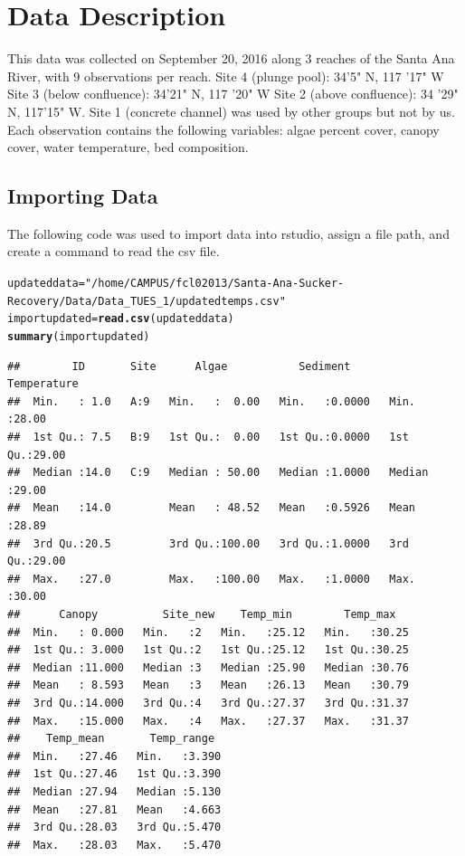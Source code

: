 \documentclass{article}\usepackage[]{graphicx}\usepackage[]{color}
\makeatletter
\newcommand{\hlstr}[1]{\textcolor[rgb]{0.192,0.494,0.8}{#1}}%
\newcommand{\hlstd}[1]{\textcolor[rgb]{0.345,0.345,0.345}{#1}}%
\newcommand{\hlkwb}[1]{\textcolor[rgb]{0.69,0.353,0.396}{#1}}%
\newcommand{\hlkwd}[1]{\textcolor[rgb]{0.737,0.353,0.396}{\textbf{#1}}}%
\newenvironment{kframe}{%
 \def\at@end@of@kframe{}%
 \ifinner\ifhmode%
  \def\at@end@of@kframe{\end{minipage}}%
  \begin{minipage}{\columnwidth}%
 \fi\fi%
 \def\FrameCommand##1{\hskip\@totalleftmargin \hskip-\fboxsep
 \colorbox{shadecolor}{##1}\hskip-\fboxsep
     \hskip-\linewidth \hskip-\@totalleftmargin \hskip\columnwidth}%
 \MakeFramed {\advance\hsize-\width
   \@totalleftmargin\z@ \linewidth\hsize
   \@setminipage}}%
 {\par\unskip\endMakeFramed%
 \at@end@of@kframe}
\newenvironment{knitrout}{}{} %
\makeatother
\begin{document}
\section{Data Description}

This data was collected on September 20, 2016 along 3 reaches of the Santa Ana River, with 9 observations per reach. 
Site 4 (plunge pool): 34'5" N, 117 '17" W
Site 3 (below confluence): 34'21" N, 117 '20" W
Site 2 (above confluence): 34 '29" N, 117'15" W. 
Site 1 (concrete channel) was used by other groups but not by us. 
Each observation contains the following variables: algae percent cover, canopy cover, water temperature, bed composition. 


\subsection{Importing Data}

The following code was used to import data into rstudio, assign a file path, and create a command to read the csv file. 
\begin{knitrout}
\color{fgcolor}\begin{kframe}
\begin{alltt}
\hlstd{updateddata}\hlkwb{=} \hlstr{"/home/CAMPUS/fcl02013/Santa-Ana-Sucker-Recovery/Data/Data_TUES_1/updatedtemps.csv"}
\hlstd{importupdated}\hlkwb{=}\hlkwd{read.csv}\hlstd{(updateddata)}
\hlkwd{summary}\hlstd{(importupdated)}
\end{alltt}
\begin{verbatim}
##        ID       Site      Algae           Sediment       Temperature   
##  Min.   : 1.0   A:9   Min.   :  0.00   Min.   :0.0000   Min.   :28.00  
##  1st Qu.: 7.5   B:9   1st Qu.:  0.00   1st Qu.:0.0000   1st Qu.:29.00  
##  Median :14.0   C:9   Median : 50.00   Median :1.0000   Median :29.00  
##  Mean   :14.0         Mean   : 48.52   Mean   :0.5926   Mean   :28.89  
##  3rd Qu.:20.5         3rd Qu.:100.00   3rd Qu.:1.0000   3rd Qu.:29.00  
##  Max.   :27.0         Max.   :100.00   Max.   :1.0000   Max.   :30.00  
##      Canopy          Site_new    Temp_min        Temp_max    
##  Min.   : 0.000   Min.   :2   Min.   :25.12   Min.   :30.25  
##  1st Qu.: 3.000   1st Qu.:2   1st Qu.:25.12   1st Qu.:30.25  
##  Median :11.000   Median :3   Median :25.90   Median :30.76  
##  Mean   : 8.593   Mean   :3   Mean   :26.13   Mean   :30.79  
##  3rd Qu.:14.000   3rd Qu.:4   3rd Qu.:27.37   3rd Qu.:31.37  
##  Max.   :15.000   Max.   :4   Max.   :27.37   Max.   :31.37  
##    Temp_mean       Temp_range   
##  Min.   :27.46   Min.   :3.390  
##  1st Qu.:27.46   1st Qu.:3.390  
##  Median :27.94   Median :5.130  
##  Mean   :27.81   Mean   :4.663  
##  3rd Qu.:28.03   3rd Qu.:5.470  
##  Max.   :28.03   Max.   :5.470
\end{verbatim}
\end{kframe}
\end{knitrout}
\end{document}
